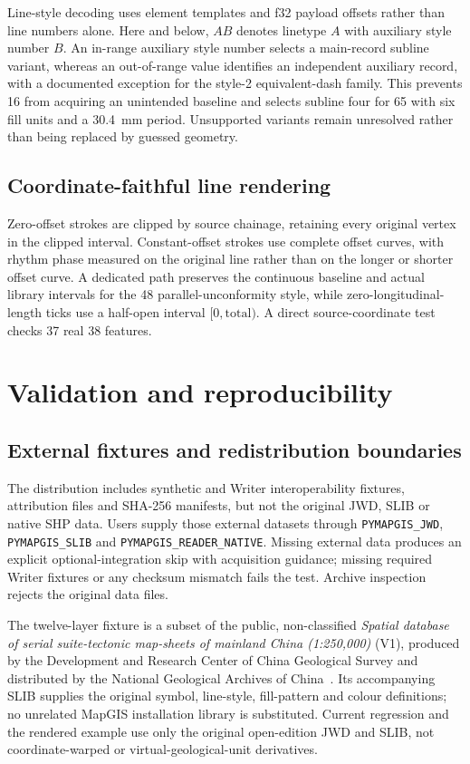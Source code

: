 \documentclass[preprint,12pt,numbers]{elsarticle}
\begin{document}
Line-style decoding uses element templates and f32 payload offsets rather than line numbers alone. Here and below, $A$\textbar$B$ denotes linetype $A$ with auxiliary style number $B$. An in-range auxiliary style number selects a main-record subline variant, whereas an out-of-range value identifies an independent auxiliary record, with a documented exception for the style-2 equivalent-dash family. This prevents 16 from acquiring an unintended baseline and selects subline four for 65 with six fill units and a 30.4~mm period. Unsupported variants remain unresolved rather than being replaced by guessed geometry.

\subsection{Coordinate-faithful line rendering}

Zero-offset strokes are clipped by source chainage, retaining every original vertex in the clipped interval. Constant-offset strokes use complete offset curves, with rhythm phase measured on the original line rather than on the longer or shorter offset curve. A dedicated path preserves the continuous baseline and actual library intervals for the 48 parallel-unconformity style, while zero-longitudinal-length ticks use a half-open interval $[0,\mathrm{total})$. A direct source-coordinate test checks 37 real 38 features.

\section{Validation and reproducibility}

\subsection{External fixtures and redistribution boundaries}

The distribution includes synthetic and Writer interoperability fixtures, attribution files and SHA-256 manifests, but not the original JWD, SLIB or native SHP data. Users supply those external datasets through \texttt{PYMAPGIS\_JWD}, \texttt{PYMAPGIS\_SLIB} and \texttt{PYMAPGIS\_READER\_NATIVE}. Missing external data produces an explicit optional-integration skip with acquisition guidance; missing required Writer fixtures or any checksum mismatch fails the test. Archive inspection rejects the original data files.

The twelve-layer fixture is a subset of the public, non-classified \emph{Spatial database of serial suite-tectonic map-sheets of mainland China (1:250,000)} (V1), produced by the Development and Research Center of China Geological Survey and distributed by the National Geological Archives of China~\cite{dataset2018,datasetpaper2018}. Its accompanying SLIB supplies the original symbol, line-style, fill-pattern and colour definitions; no unrelated MapGIS installation library is substituted. Current regression and the rendered example use only the original open-edition JWD and SLIB, not coordinate-warped or virtual-geological-unit derivatives.
\end{document}
